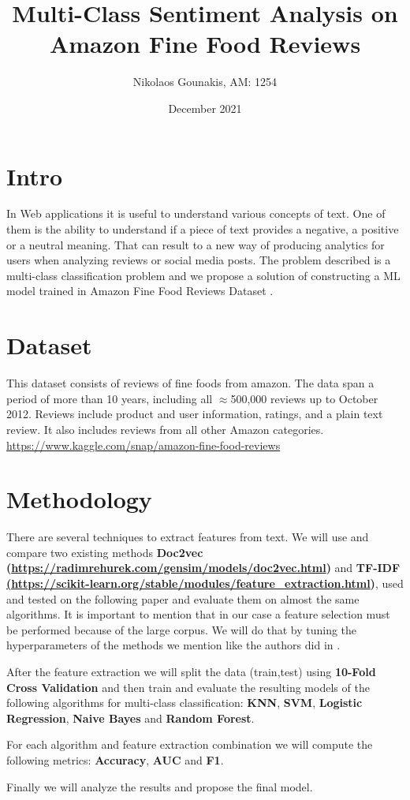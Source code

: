 \documentclass[12pt]{extarticle}
\title{Multi-Class Sentiment Analysis on Amazon Fine Food Reviews}
\author{Nikolaos Gounakis, AM: 1254}
\date{December 2021}
\begin{document}
\maketitle

\section{Intro}
In Web applications it is useful to understand various concepts of text. 
One of them is the ability to understand if a piece of text provides a negative,
a positive or a neutral meaning. That can result to a new way of producing analytics 
for users when analyzing reviews or social media posts.
The problem described is a multi-class classification problem and we propose 
a solution of constructing a ML model trained in Amazon Fine Food Reviews 
Dataset \cite{10.1145/2488388.2488466}. 

\section{Dataset}
This dataset consists of reviews of fine foods from amazon. 
The data span a period of more than 10 years, including all $\approx$500,000 reviews up to October 2012. Reviews include product and user information, ratings, and a plain text review. 
It also includes reviews from all other Amazon categories.
\url{https://www.kaggle.com/snap/amazon-fine-food-reviews}

\section{Methodology}

There are several techniques to extract features from text. We will use 
and compare two existing methods \textbf{Doc2vec (\url{https://radimrehurek.com/gensim/models/doc2vec.html})} and
\textbf{TF-IDF \url{(https://scikit-learn.org/stable/modules/feature_extraction.html})}, 
used and tested on the following paper \cite{madasu2019study} and evaluate them on 
almost the same algorithms. It is important to mention that in our case a feature
selection must be performed because of the large corpus. We will do that by tuning the hyperparameters
of the methods we mention like the authors did in \cite{madasu2019study}. 

After the feature extraction we will split the data (train,test) using
\textbf{10-Fold Cross Validation} and then train and evaluate the resulting models 
of the following algorithms for multi-class classification:
\textbf{KNN}, \textbf{SVM}, \textbf{Logistic Regression}, 
\textbf{Naive Bayes} and \textbf{Random Forest}.

For each algorithm and feature extraction combination we will compute the 
following  metrics: \textbf{Accuracy}, \textbf{AUC} and \textbf{F1}.

Finally we will analyze the results and propose the final model.



\end{document}
